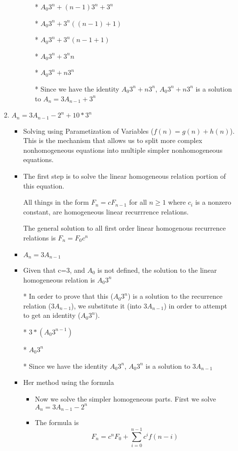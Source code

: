 \begin{enumerate}
\begin{enumerate}
\begin{itemize}
\begin{itemize}
      \item [*] $A_{0}3^{n} + (n-1)3^{n} + 3^{n}$
      \item [*] $A_{0}3^{n} + 3^{n}((n-1) + 1)$
      \item [*] $A_{0}3^{n} + 3^{n}(n-1+1)$
      \item [*] $A_{0}3^{n} + 3^{n}n$
      \item [*] $A_{0}3^{n} + n3^{n}$
      \item [*] Since we have the identity $A_{0}3^{n}+n3^{n}$, $A_{0}3^{n}+n3^{n}$ is a solution to $A_{n}=3A_{n-1}+3^{n}$
      \end{itemize} %
    \end{itemize}
  \item $A_{n}=3A_{n-1}-2^{n}+10*3^{n}$
    \begin{itemize} %
    \item Solving using Parametization of Variables ($f(n)=g(n)+h(n)$). This is the mechanism that allows us to split more complex nonhomogeneous equations into multiple simpler nonhomogeneous equations.
    \item The first step is to solve the linear homogeneous relation portion of this equation.
    \item [] All things in the form $F_{n}=cF_{n-1}$ for all $n\geq1$ where $c_{i}$ is a nonzero constant, are homogeneous linear recurrrence relations.
    \item [] The general solution to all first order linear homogenous recurrence relations is $F_{n}=F_{0}c^{n}$
    \item $A_{n}=3A_{n-1}$
    \item Given that c=3, and $A_{0}$ is not defined, the solution to the linear homogeneous relation is $A_{0}3^{n}$
    \item [*] In order to prove that this ($A_{0}3^{n}$) is a solution to the recurrence relation ($3A_{n-1}$), we substitute it (into $3A_{n-1}$) in order to attempt to get an identity ($A_{0}3^{n}$).
    \item [*] $3*(A_{0}3^{n-1})$
    \item [*] $A_{0}3^{n}$
    \item [*] Since we have the identity $A_{0}3^{n}$, $A_{0}3^{n}$ is a solution to $3A_{n-1}$
    \item Her method using the formula
      \begin{itemize} %
      \item Now we solve the simpler homogeneous parts. First we solve $A_{n}=3A_{n-1}-2^{n}$
      \item The formula is $$F_{n}=c^{n}F_{0} + \sum\limits_{i=0}^{n-1}c^{i}f(n-i)$$

\end{itemize}
\end{itemize}
\end{enumerate}
\end{enumerate}
